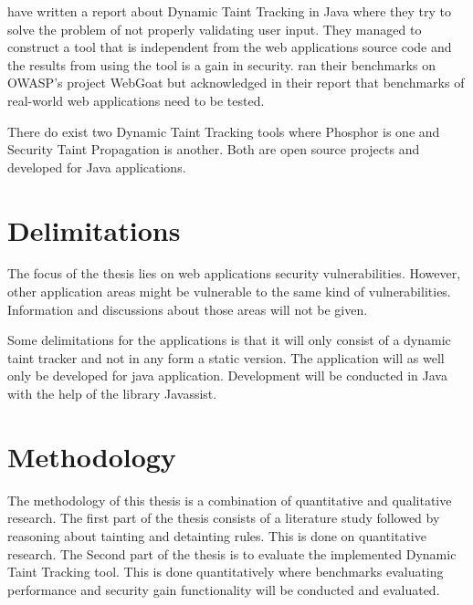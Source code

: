 \textcite{Haldar} have written a report about Dynamic Taint Tracking in Java where they try to solve the problem of not properly validating user input. They managed to construct a tool that is independent from the web applications source code and the results from using the tool is a gain in security. \textcite{Haldar} ran their benchmarks on OWASP’s project WebGoat \parencite{webgoat} but acknowledged in their report that benchmarks of real-world web applications need to be tested.

There do exist two Dynamic Taint Tracking tools where Phosphor \parencite{phosphor} is one and Security Taint Propagation \parencite{securityTaint} is another. Both are open source projects and developed for Java applications.


\section{Delimitations}
The focus of the thesis lies on web applications security vulnerabilities. However, other application areas might be vulnerable to the same kind of vulnerabilities. Information and discussions about those areas will not be given.

Some delimitations for the applications is that it will only consist of a dynamic taint tracker and not in any form a static version. The application will as well only be developed for java application. Development will be conducted in Java with the help of the library Javassist.


\section{Methodology}
The methodology of this thesis is a combination of quantitative and qualitative research. The first part of the thesis consists of a literature study followed by reasoning about tainting and detainting rules. This is done on quantitative research. The Second part of the thesis is to evaluate the implemented Dynamic Taint Tracking tool. This is done quantitatively where benchmarks evaluating performance and security gain functionality will be conducted and evaluated.
